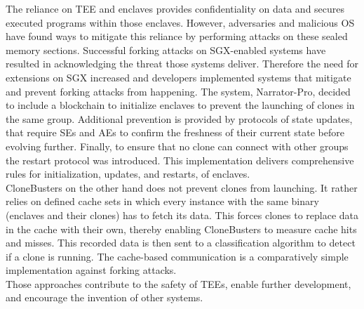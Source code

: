 The reliance on TEE and enclaves provides confidentiality on data and secures executed programs within those enclaves. However, adversaries and malicious OS have found ways to mitigate this reliance by performing attacks on these sealed memory sections. Successful forking attacks on SGX-enabled systems have resulted in acknowledging the threat those systems deliver. Therefore the need for extensions on SGX increased and developers implemented systems that mitigate and prevent forking attacks from happening. 
The system, Narrator-Pro, decided to include a blockchain to initialize enclaves to prevent the launching of clones in the same group. Additional prevention is provided by protocols of state updates, that require SEs and AEs to confirm the freshness of their current state before evolving further. Finally, to ensure that no clone can connect with other groups the restart protocol was introduced.
This implementation delivers comprehensive rules for initialization, updates, and restarts, of enclaves. \\
CloneBusters on the other hand does not prevent clones from launching. It rather relies on defined cache sets in which every instance with the same binary (enclaves and their clones) has to fetch its data. This forces clones to replace data in the cache with their own, thereby enabling CloneBusters to measure cache hits and misses. This recorded data is then sent to a classification algorithm to detect if a clone is running. The cache-based communication is a comparatively simple implementation against forking attacks.\\
Those approaches contribute to the safety of TEEs, enable further development, and encourage the invention of other systems. 